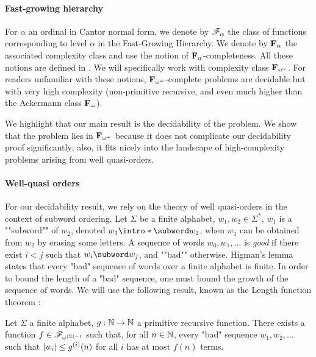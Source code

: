 \paragraph*{Fast-growing hierarchy}

For $\alpha$ an ordinal in Cantor normal form, we denote by $\mathscr{F}_{\alpha}$ the class of functions corresponding to level $\alpha$ in the Fast-Growing Hierarchy. We denote by $\mathbf{F}_{\alpha}$ the associated complexity class and use the notion of $\mathbf{F}_{\alpha}$-completeness. All these notions are defined in \cite{Schmitz16}. We will specifically work with complexity class $\mathbf{F}_{\omega^{\omega}}$. For readers unfamiliar with these notions, $\mathbf{F}_{\omega^{\omega}}$-complete problems are decidable but with very high complexity (non-primitive recursive, and even much higher than the Ackermann class $\mathbf{F}_{\omega}$). 

We highlight that our main result is the decidability of the problem. We show that the problem lies in $\mathbf{F}_{\omega^{\omega}}$ because it does not complicate our decidability proof significantly; also, it fits nicely into the landscape of high-complexity problems arising from well quasi-orders. 

\paragraph*{Well-quasi orders}

For our decidability result, we rely on the theory of well quasi-orders in the context of subword ordering.
Let $\Sigma$ be a finite alphabet, $w_1, w_2 \in \Sigma^*$, $w_1$ is a ""subword"" of $w_2$, denoted $w_1 \intro*\subword w_2$, when $w_1$ can be obtained from $w_2$ by erasing some letters. 
A sequence of words $w_0, w_1, \ldots$ is \emph{good} if there exist $i<j$ such that $w_i \subword w_j$, and ""bad"" otherwise. Higman's lemma \cite{Higman52} states that every "bad" sequence of words over a finite alphabet is finite.
In order to bound the length of a "bad" sequence, one must bound the growth of the sequence of words. 
We will use the following result, known as the Length function theorem \cite{SchmitzS2011upperHigman}:

\begin{theorem}
	\label{thm:lengthfcttheorem}
	Let $\Sigma$ a finite alphabet, $g : \mathbb{N} \to \mathbb{N}$ a primitive recursive function.
	There exists a function $f \in \mathscr{F}_{\omega^{|\Sigma| - 1}}$ such that, for all $n \in \mathbb{N}$, every "bad" sequence $w_1, w_2, \ldots$ such that $|w_i| \leq g^{(i)}(n)$ for all $i$ has at most $f(n)$ terms. 
\end{theorem}



